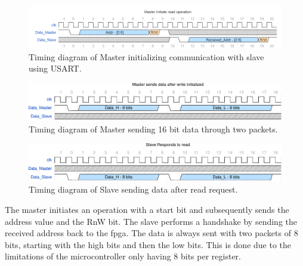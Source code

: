 \documentclass[main.tex]{subfiles}
\begin{document}
\begin{figure}[!htpb]
    \centering
    \includegraphics[width=15cm, scale=1]{images/MasterInitRead.png}
    \caption{Timing diagram of Master initializing communication with slave using USART.}
    \label{fig: master_init}
\end{figure}
\FloatBarrier

\begin{figure}[!htpb]
    \centering
    \includegraphics[width=15cm, scale=1]{images/MasterSendData-eps-converted-to.pdf}
    \caption{Timing diagram of Master sending 16 bit data through two packets.}
    \label{fig: master_send}
\end{figure}
\FloatBarrier

\begin{figure}[!htpb]
    \centering
    \includegraphics[width=15cm, scale=1]{images/SlaveRespondRead-eps-converted-to.pdf}
    \caption{Timing diagram of Slave sending data after read request.}
    \label{fig: slave_read}
\end{figure}
\FloatBarrier

The master initiates an operation with a start bit and subsequently sends the address value and the RnW bit. The slave performs a handshake by sending the received address back to the \gls{fpga}. The data is always sent with two packets of 8 bits, starting with the high bits and then the low bits. This is done due to the limitations of the microcontroller only having 8 bits per register. 


\end{document}
